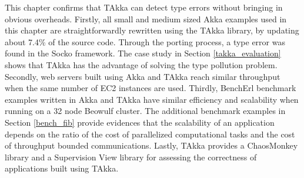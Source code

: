 This chapter confirms that TAkka can detect type errors without bringing in 
obvious overheads.  Firstly, all small and medium sized Akka examples used in 
this chapter are straightforwardly rewritten using the TAkka library, by 
updating about 7.4\% of the source code.  Through the porting process, a type 
error was found in the Socko framework.  The case study in Section 
\ref{takka_evaluation} shows that TAkka has the 
advantage of solving the type pollution problem.  Secondly, web 
servers built using Akka and TAkka reach similar throughput when the same 
number of EC2 instances are used.  Thirdly, BenchErl benchmark examples written 
in Akka and TAkka have similar efficiency and scalability when running on a 
32 node Beowulf cluster.  The additional benchmark examples in Section 
\ref{bench_fib} provide evidences that the scalability of an application 
depends on the ratio of the cost of parallelized computational tasks and the 
cost of throughput bounded communications.  Lastly, TAkka provides a ChaosMonkey 
library and a Supervision View library for assessing the correctness of 
applications built using TAkka. 


